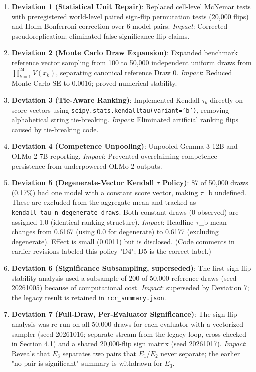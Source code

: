 \documentclass[11pt]{article}
\begin{document}
\begin{enumerate}
\item \textbf{Deviation 1 (Statistical Unit Repair)}: Replaced cell-level McNemar tests with preregistered world-level paired sign-flip permutation tests (20,000 flips) and Holm-Bonferroni correction over 6 model pairs. \emph{Impact}: Corrected pseudoreplication; eliminated false significance flip claims.
\item \textbf{Deviation 2 (Monte Carlo Draw Expansion)}: Expanded benchmark reference vector sampling from 100 to 50,000 independent uniform draws from $\prod_{k=1}^{24} V(x_k)$, separating canonical reference Draw 0. \emph{Impact}: Reduced Monte Carlo SE to 0.0016; proved numerical stability.
\item \textbf{Deviation 3 (Tie-Aware Ranking)}: Implemented Kendall $\tau_b$ directly on score vectors using \texttt{scipy.stats.kendalltau(variant='b')}, removing alphabetical string tie-breaking. \emph{Impact}: Eliminated artificial ranking flips caused by tie-breaking code.
\item \textbf{Deviation 4 (Competence Unpooling)}: Unpooled Gemma 3 12B and OLMo 2 7B reporting. \emph{Impact}: Prevented overclaiming competence persistence from underpowered OLMo 2 outputs.
\item \textbf{Deviation 5 (Degenerate-Vector Kendall $\tau$ Policy)}: 87 of 50,000 draws (0.17\%) had one model with a constant score vector, making $\tau$\_b undefined. These are excluded from the aggregate mean and tracked as \texttt{kendall\_tau\_n\_degenerate\_draws}. Both-constant draws (0 observed) are assigned 1.0 (identical ranking structure). \emph{Impact}: Headline $\tau$\_b mean changes from 0.6167 (using 0.0 for degenerate) to 0.6177 (excluding degenerate). Effect is small (0.0011) but is disclosed. (Code comments in earlier revisions labeled this policy "D4"; D5 is the correct label.)
\item \textbf{Deviation 6 (Significance Subsampling, superseded)}: The first sign-flip stability analysis used a subsample of 200 of 50,000 reference draws (seed 20261005) because of computational cost. \emph{Impact}: superseded by Deviation 7; the legacy result is retained in \texttt{rcr\_summary.json}.
\item \textbf{Deviation 7 (Full-Draw, Per-Evaluator Significance)}: The sign-flip analysis was re-run on all 50,000 draws for each evaluator with a vectorized sampler (seed 20261016; separate stream from the legacy loop, cross-checked in Section 4.1) and a shared 20,000-flip sign matrix (seed 20261017). \emph{Impact}: Reveals that $E_3$ separates two pairs that $E_1$/$E_2$ never separate; the earlier "no pair is significant" summary is withdrawn for $E_3$.

\end{enumerate}
\end{document}
